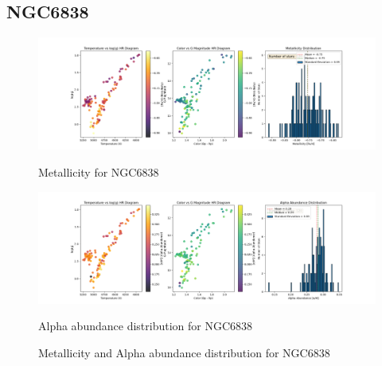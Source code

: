 \documentclass[a4paper,12pt]{article}
\begin{document}
\subsection{NGC6838}
\begin{figure}[H]
    \centering
    \begin{minipage}[b]{0.8\textwidth}
        \centering
        \includegraphics[width=\textwidth]{NGC6838_metalicity.png}
        \caption{Metallicity for NGC6838}
        \label{fig:NGC6838_metalicity}
    \end{minipage}
    \hfill
    \begin{minipage}[b]{0.8\textwidth}
        \centering
        \includegraphics[width=\textwidth]{NGC6838_alpha.png}
        \caption{Alpha abundance distribution for NGC6838}
        \label{fig:NGC6838_alpha}
    \end{minipage}
    \caption{Metallicity and Alpha abundance distribution for NGC6838}
    \label{fig:NGC6838_combined}
\end{figure}
\clearpage
\end{document}
